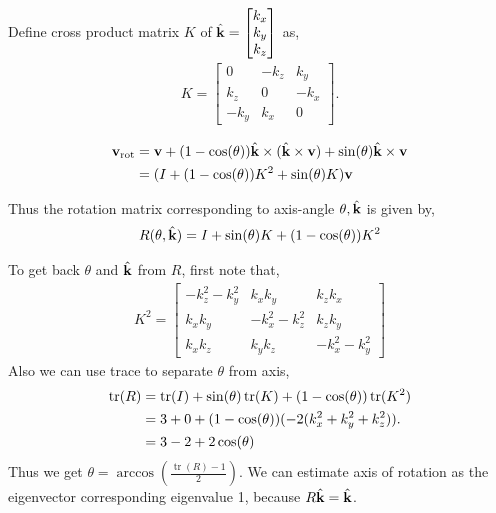 \documentclass{article}
\DeclareMathOperator{\tr}{tr}
\begin{document}
Define  cross  product matrix $K$  of $\hat{\mathbf{k}} = \begin{bmatrix}  k_x \\ k_y
  \\ k_z \end{bmatrix}$  as,
\begin{align}
  K  = \begin{bmatrix}
    0   & - k_z & k_y   \\
    k_z   & 0 & -k_x   \\
    -k_y   & k_x & 0
  \end{bmatrix}.
\end{align}

\begin{align}
\mathbf{v}_{\text{rot}} &=  \mathbf{v} + (1-\cos(\theta)) \hat{\mathbf{k}} \times (\hat{\mathbf{k}} \times \mathbf{v}) +  \sin(\theta) \hat{\mathbf{k}} \times \mathbf{v}
                    \notag\\
  &= (I + (1 -\cos(\theta)) K^2  + \sin(\theta) K)\mathbf{v}
\end{align}

Thus the rotation matrix corresponding  to axis-angle $\theta, \hat{\mathbf{k}}$ is
given by,
%
\begin{align}
  R(\theta, \hat{\mathbf{k}}) = I + \sin(\theta)K + (1-\cos(\theta))K^2
\end{align}
%

To get back $\theta$ and $\hat{\mathbf{k}}$   from $R$,  first  note that,
% 
\begin{align}
  K^2 =  \begin{bmatrix}
    -k_z^2  - k_y^2  & k_x k_y & k_z k_x \\
    k_xk_y  & -k_x^2- k_z^2 & k_z k_y \\
    k_x k_z  & k_y k_z &  -k_x^2  - k_y^2
    \end{bmatrix} 
\end{align}
% 
Also we can use trace to separate $\theta$ from axis,
%
\begin{align}
  \tr(R) &= \tr(I)  + \sin(\theta)\tr(K) + (1-\cos(\theta))\tr(K^2)
  \notag\\
  &= 3 + 0 + (1-\cos(\theta))(-2(k_x^2 + k_y^2 + k_z^2)).
    \notag\\
  &= 3 - 2 +2\cos(\theta)
\end{align}
%
Thus we get $\theta  =  \arccos(\frac{\tr(R)-1}{2})$. We can estimate axis of
rotation as the  eigenvector corresponding  eigenvalue 1,   because $R\hat{\mathbf{k}}
= \hat{\mathbf{k}}$.

\end{document}
